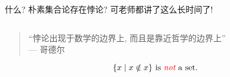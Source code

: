 \begin{frame}{}
  \begin{center}
     什么? 朴素集合论存在悖论? 可老师都讲了这么长时间了!
    \vspace{0.60cm}

    \begin{columns}
        \pause
        \pause
    \end{columns}

    \pause
    \vspace{0.80cm}
    \begin{quote}
      ``悖论出现于数学的边界上, 而且是靠近哲学的边界上'' \\[6pt]
      \hfill --- 哥德尔
    \end{quote}
  \end{center}
\end{frame}

\begin{frame}{}
  \begin{center}

    \pause
    \vspace{0.20cm}
    \begin{theorem}
      \[
        \{x \mid x \notin x\} \text{ is \textcolor{red}{\it not} a set.}
      \]
    \end{theorem}
  \end{center}
\end{frame}
